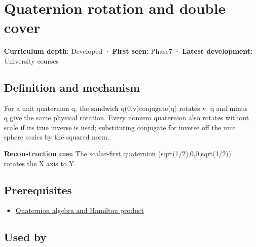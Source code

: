 \hypertarget{appendix-8e61ab68f6b2}{}\label{referencestart:appendix-8e61ab68f6b2}
\section{Quaternion rotation and double cover}\label{appendix-8e61ab68f6b2-quaternion-rotation-and-double-cover}

\hypertarget{appendix-8e61ab68f6b2-quaternion-rotation-and-double-cover}{}

\textbf{Curriculum depth:} Developed · \textbf{First seen:} Phase7 · \textbf{Latest development:} University courses

\begin{allmightroledefinition}

\subsection{Definition and mechanism}\label{appendix-8e61ab68f6b2-definition-and-mechanism}

\hypertarget{appendix-8e61ab68f6b2-definition-and-mechanism}{}

For a unit quaternion q, the sandwich q(0,v)conjugate(q) rotates v. q and minus q give the same physical rotation. Every nonzero quaternion also rotates without scale if its true inverse is used; substituting conjugate for inverse off the unit sphere scales by the squared norm.

\end{allmightroledefinition}

\textbf{Reconstruction cue:} The scalar-first quaternion (sqrt(1/2),0,0,sqrt(1/2)) rotates the X axis to Y.

\subsection{Prerequisites}\label{appendix-8e61ab68f6b2-prerequisites}

\hypertarget{appendix-8e61ab68f6b2-prerequisites}{}

\begin{itemize}
\tightlist
\item
  \hyperref[appendix-965d9260eeab]{Quaternion algebra and Hamilton product}
\end{itemize}

\subsection{Used by}\label{appendix-8e61ab68f6b2-used-by}

